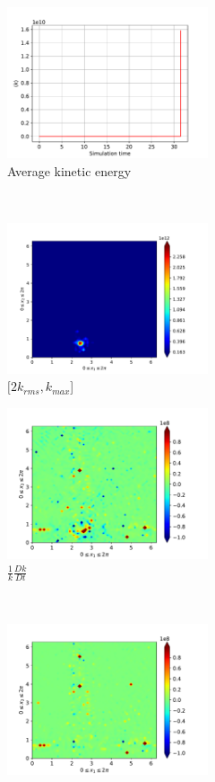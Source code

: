\begin{figure}[H]
    \begin{subfigure}[H]{0.45\textwidth}
        \includegraphics[height=1.75in]{media/run-cds-65-5k/ke-average4750}
        \caption{Average kinetic energy}
    \end{subfigure}
    ~
    \begin{subfigure}[H]{0.45\textwidth}
        \includegraphics[height=1.75in]{media/run-cds-65-5k/ke-2-4750}
        \caption{$[2k_{rms}, k_{max} $] }
    \end{subfigure}
    \newline
    \begin{subfigure}[H]{0.45\textwidth}
        \includegraphics[height=1.75in]{media/run-cds-65-5k/ke-4750}
        \caption{$\frac{1}{k} \frac{D k}{Dt}$}
    \end{subfigure}
    ~
    \begin{subfigure}{0.45\textwidth}
        \includegraphics[height=1.75in]{media/run-cds-65-5k/A-ke-4750}

\end{subfigure}
\end{figure}
